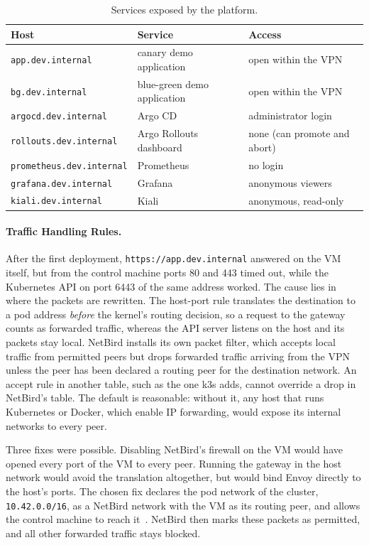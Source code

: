 \begin{table}[ht]
	\footnotesize
	\centering
	\begin{tabular}{ l l l }
		\toprule
		Host & Service & Access \\
		\midrule
		\texttt{app.dev.internal} & canary demo application & open within the VPN \\
		\texttt{bg.dev.internal} & blue-green demo application & open within the VPN \\
		\texttt{argocd.dev.internal} & Argo CD & administrator login \\
		\texttt{rollouts.dev.internal} & Argo Rollouts dashboard & none (can promote and abort) \\
		\texttt{prometheus.dev.internal} & Prometheus & no login \\
		\texttt{grafana.dev.internal} & Grafana & anonymous viewers \\
		\texttt{kiali.dev.internal} & Kiali & anonymous, read-only \\
		\bottomrule
	\end{tabular}
	\caption{Services exposed by the platform.}
	\label{tab:ImplUIs}
\end{table}

\paragraph{Traffic Handling Rules.} After the first deployment, \texttt{https://app.dev.internal} answered on the VM itself, but from the control machine ports 80 and 443 timed out, while the Kubernetes API on port 6443 of the same address worked. The cause lies in where the packets are rewritten. The host-port rule translates the destination to a pod address \emph{before} the kernel's routing decision, so a request to the gateway counts as forwarded traffic, whereas the API server listens on the host and its packets stay local. NetBird installs its own packet filter, which accepts local traffic from permitted peers but drops forwarded traffic arriving from the VPN unless the peer has been declared a routing peer for the destination network. An accept rule in another table, such as the one k3s adds, cannot override a drop in NetBird's table. The default is reasonable: without it, any host that runs Kubernetes or Docker, which enable IP forwarding, would expose its internal networks to every peer.

Three fixes were possible. Disabling NetBird's firewall on the VM would have opened every port of the VM to every peer. Running the gateway in the host network would avoid the translation altogether, but would bind Envoy directly to the host's ports. The chosen fix declares the pod network of the cluster, \texttt{10.42.0.0/16}, as a NetBird network with the VM as its routing peer, and allows the control machine to reach it~\cite{NetBirdNetworks}. NetBird then marks these packets as permitted, and all other forwarded traffic stays blocked.


